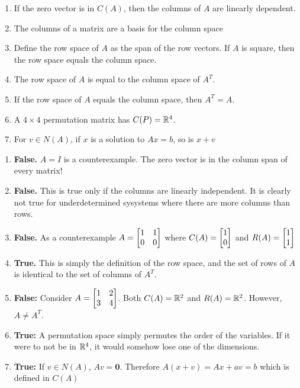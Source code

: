 \documentclass[11pt]{article}
\begin{document}
\begin{itemize}
\begin{examplebox}[1.3]\quad
	\begin{enumerate}
		\item If the zero vector is in $C(A)$, then the columns of $A$ are linearly dependent.
		\item The columns of a matrix are a basis for the column space
		\item Define the row space of $A$ as the span of the row vectors. If $A$ is square, then the row space equals the column space.
		\item The row space of $A$ is equal to the column space of $A^{T}$.
		\item If the row space of $A$ equals the column space, then $A^{T} = A$.
		\item A $4 \times 4$ permutation matrix has $C(P) = \mathbb{R}^{4}$.
		\item For $ v \in N(A) $, if $x$ is a solution to $Ax=b$, so is $x + v$
	\end{enumerate}
	\begin{solution}[1.3]\quad\vspace{-0.4cm}
		\begin{enumerate}
			\item \textbf{False.} $A=I$ is a counterexample. The zero vector is in the column span of every matrix!
			\item \textbf{False.} This is true only if the columns are linearly independent. It is clearly not true for underdetermined sysystems where there are more columns than rows.
			\item \textbf{False.} As a counterexample $A = \begin{bmatrix} 1 & 1 \\ 0 & 0 \end{bmatrix}$ where $C(A) = \begin{bmatrix} 1 \\ 0 \end{bmatrix}$ and $R(A) = \begin{bmatrix} 1 \\ 1 \end{bmatrix}$
			\item \textbf{True.} This is simply the definition of the row space, and the set of rows of $A$ is identical to the set of columns of $A^{T}$.
			\item \textbf{False:} Consider $A = \begin{bmatrix} 1 & 2 \\ 3 & 4 \end{bmatrix}$. Both $C(A) = \mathbb{R}^{2}$ and $R(A) = \mathbb{R}^{2}$. However, $A \neq A^{T}$.
			\item \textbf{True:} A permutation space simply permutes the order of the variables. If it were to not be in $\mathbb{R}^{4}$, it would somehow lose one of the dimensions.
			\item \textbf{True:} If $v \in N(A)$, $Av = \mathbf{0}$. Therefore $A(x+v) = Ax+av =b$ which is defined in $C(A)$ \end{enumerate}
	    

\end{solution}
\end{examplebox}
\end{itemize}
\end{document}
